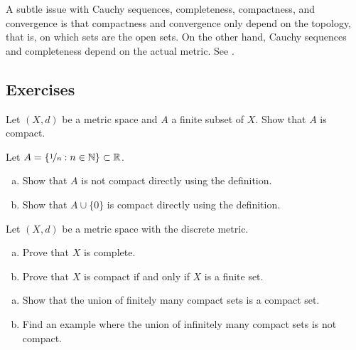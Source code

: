 \begin{remark}
A subtle issue with Cauchy sequences, completeness, compactness,
and convergence is that compactness and convergence only depend on the
topology, that is, on which sets are the open sets.  On the other hand,
Cauchy sequences and completeness depend on the actual metric.
See .
\end{remark}

\subsection{Exercises}

\begin{exercise}
Let $(X,d)$ be a metric space and $A$ a finite subset of $X$.
Show that $A$ is compact.
\end{exercise}

\begin{samepage}
\begin{exercise}
Let $A = \{ \nicefrac{1}{n} : n \in {\mathbb{N}} \} \subset {\mathbb{R}}$.
\begin{enumerate}[a)]
\item
Show that $A$ is
not compact directly using the definition.
\item
Show that $A \cup \{ 0 \}$ is
compact directly using the definition.
\end{enumerate}
\end{exercise}
\end{samepage}


\begin{exercise}
Let $(X,d)$ be a metric space with the discrete metric.
\begin{enumerate}[a)]
\item
Prove that $X$ is complete.
\item
Prove that $X$ is compact if and only if $X$ is a finite set.
\end{enumerate}
\end{exercise}

\begin{exercise}
\leavevmode
\begin{enumerate}[a)]
\item
Show that the union of finitely many compact sets is a compact set.
\item
Find an example where the union of infinitely many compact sets is not
compact.
\end{enumerate}
\end{exercise}

